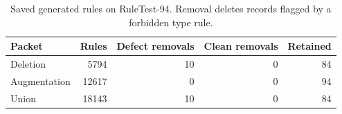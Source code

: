 \begin{table}[t]
\centering
\caption{Saved generated rules on RuleTest-94. Removal deletes records flagged by a forbidden type rule.}
\label{tab:rule_bridge}
\footnotesize
\setlength{\tabcolsep}{3pt}
\begin{tabular*}{\textwidth}{@{\extracolsep{\fill}}lrrrr@{}}
\toprule
Packet & Rules & Defect removals & Clean removals & Retained \\
\midrule
Deletion & 5794 & 10 & 0 & 84 \\
Augmentation & 12617 & 0 & 0 & 94 \\
Union & 18143 & 10 & 0 & 84 \\
\bottomrule
\end{tabular*}
\end{table}
